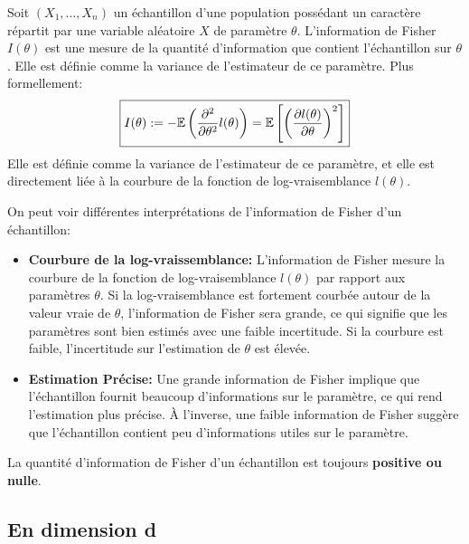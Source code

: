 \begin{definition}
    Soit $(X_1, \dots, X_n)$ un échantillon d'une population possédant un caractère répartit par une variable aléatoire $X$ 
    de paramètre $\theta$. L'information de Fisher $I(\theta)$ est une mesure de la quantité d'information que contient 
    l'échantillon sur $\theta$. Elle est définie comme la variance de l'estimateur de ce paramètre. 
    Plus formellement: 
        \[ \boxed{ I(\theta) := - \mathbb{E} \left( \frac{\partial^2}{\partial \theta^2} l(\theta) \right) = \mathbb{E} \left[ \left( \frac{\partial l(\theta)}{\partial \theta}\right) ^2 \right] } \] 
    Elle est définie comme la variance de l'estimateur de ce paramètre, et elle est directement liée 
    à la courbure de la fonction de log-vraisemblance $l(\theta)$. 
\end{definition}

\begin{remark}[Interprétation]
    On peut voir différentes interprétations de l'information de Fisher d'un échantillon: 
    \begin{itemize}
        \item \textbf{Courbure de la log-vraissemblance: } L'information de Fisher mesure la courbure de la 
        fonction de log-vraisemblance $l(\theta)$ par rapport aux paramètres $\theta$. 
        Si la log-vraisemblance est fortement courbée autour de la valeur vraie de $\theta$, 
        l'information de Fisher sera grande, ce qui signifie que les paramètres sont bien estimés avec une faible incertitude. 
        Si la courbure est faible, l'incertitude sur l'estimation de $\theta$ est élevée.
        \item \textbf{Estimation Précise: } Une grande information de Fisher implique que l'échantillon 
        fournit beaucoup d'informations sur le paramètre, ce qui rend l'estimation plus précise. 
        À l'inverse, une faible information de Fisher suggère que l'échantillon contient peu d'informations 
        utiles sur le paramètre.
    \end{itemize}
\end{remark}

\begin{prop}
    La quantité d'information de Fisher d'un échantillon est toujours \textbf{positive ou nulle}. 
\end{prop}

\subsection{En dimension d}

